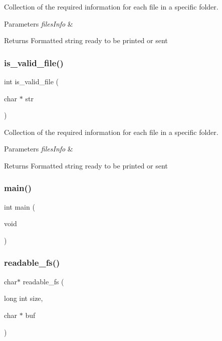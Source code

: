 Collection of the required information for each file in a specific folder. 


\begin{DoxyParams}{Parameters}
{\em files\+Info} & \\
\hline
\end{DoxyParams}
\begin{DoxyReturn}{Returns}
Formatted string ready to be printed or sent 
\end{DoxyReturn}
\mbox{\label{fileserv_8c_aaac1f10c2cd0525412fb92d9279b0670}} 
\subsubsection{is\+\_\+valid\+\_\+file()}
{\footnotesize\ttfamily int is\+\_\+valid\+\_\+file (\begin{DoxyParamCaption}\item[{char $\ast$}]{str }\end{DoxyParamCaption})}



Collection of the required information for each file in a specific folder. 


\begin{DoxyParams}{Parameters}
{\em files\+Info} & \\
\hline
\end{DoxyParams}
\begin{DoxyReturn}{Returns}
Formatted string ready to be printed or sent 
\end{DoxyReturn}
\mbox{\label{fileserv_8c_a840291bc02cba5474a4cb46a9b9566fe}} 
\subsubsection{main()}
{\footnotesize\ttfamily int main (\begin{DoxyParamCaption}\item[{void}]{ }\end{DoxyParamCaption})}

\mbox{\label{fileserv_8c_acb8985a720cf17b68e99872ba793f2cc}} 
\subsubsection{readable\+\_\+fs()}
{\footnotesize\ttfamily char$\ast$ readable\+\_\+fs (\begin{DoxyParamCaption}\item[{long int}]{size,  }\item[{char $\ast$}]{buf }\end{DoxyParamCaption})}



